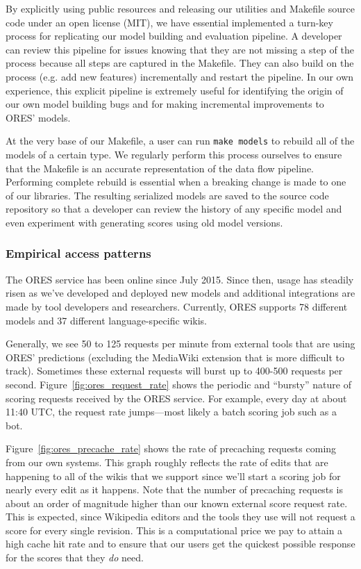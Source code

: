 By explicitly using public resources and releasing our utilities and Makefile source code under an open license (MIT), we have essential implemented a turn-key process for replicating our model building and evaluation pipeline.  A developer can review this pipeline for issues knowing that they are not missing a step of the process because all steps are captured in the Makefile.  They can also build on the process (e.g. add new features) incrementally and restart the pipeline.  In our own experience, this explicit pipeline is extremely useful for identifying the origin of our own model building bugs and for making incremental improvements to ORES' models.

At the very base of our Makefile, a user can run \texttt{make models} to rebuild all of the models of a certain type.  We regularly perform this process ourselves to ensure that the Makefile is an accurate representation of the data flow pipeline.  Performing complete rebuild is essential when a breaking change is made to one of our libraries.  The resulting serialized models are saved to the source code repository so that a developer can review the history of any specific model and even experiment with generating scores using old model versions.

\subsubsection{Empirical access patterns}
\label{sec:appendix.empirical_access_patterns}


The ORES service has been online since July 2015\cite{halfaker2015artificial}.  Since then, usage has steadily risen as we've developed and deployed new models and additional integrations are made by tool developers and researchers.  Currently, ORES supports 78 different models and 37 different language-specific wikis.

Generally, we see 50 to 125 requests per minute from external tools that are using ORES' predictions (excluding the MediaWiki extension that is more difficult to track).  Sometimes these external requests will burst up to 400-500 requests per second.  Figure~\ref{fig:ores_request_rate} shows the periodic and ``bursty'' nature of scoring requests received by the ORES service.  For example, every day at about 11:40 UTC, the request rate jumps---most likely a batch scoring job such as a bot.

Figure~\ref{fig:ores_precache_rate} shows the rate of precaching requests coming from our own systems.  This graph roughly reflects the rate of edits that are happening to all of the wikis that we support since we'll start a scoring job for nearly every edit as it happens.  Note that the number of precaching requests is about an order of magnitude higher than our known external score request rate.  This is expected, since Wikipedia editors and the tools they use will not request a score for every single revision.  This is a computational price we pay to attain a high cache hit rate and to ensure that our users get the quickest possible response for the scores that they \emph{do} need.

